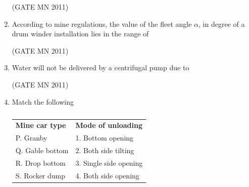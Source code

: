 \documentclass[journal]{IEEEtran}
\begin{document}
\begin{enumerate}
	\hfill(GATE MN 2011)
\begin{enumerate}
\end{enumerate}

\item According to mine regulations, the value of the fleet angle $\alpha$, in degree of a drum winder installation lies in the range of

	\hfill(GATE MN 2011)
\begin{enumerate}
\end{enumerate}

\item Water will not be delivered by a centrifugal pump due to

	\hfill(GATE MN 2011)
\begin{enumerate}
\end{enumerate}

\item Match the following

\begin{table}[H]
    \centering\normalsize
\begin{tabular}{ll}
	\textbf{Mine car type} & \textbf{Mode of unloading} \\
P. Granby & 1. Bottom opening \\
Q. Gable bottom & 2. Both side tilting \\
R. Drop bottom & 3. Single side opening \\
S. Rocker dump & 4. Both side opening
\end{tabular}
\caption{}
    \label{tab:Q16}
\end{table}


\end{enumerate}
\end{document}

